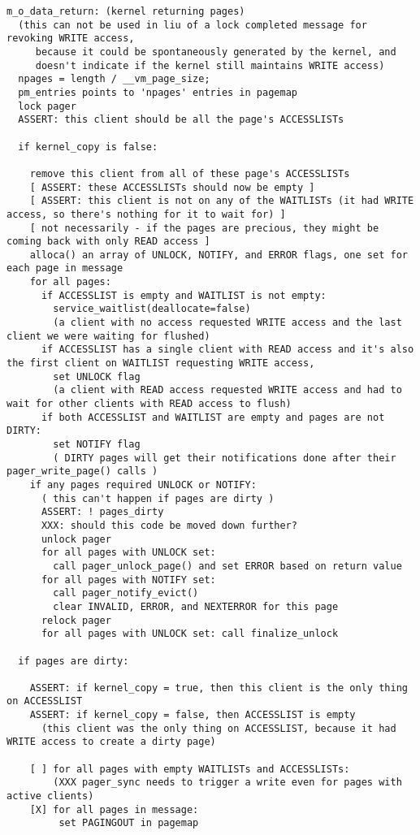 \documentclass{article}
\begin{document}
\begin{verbatim}
m_o_data_return: (kernel returning pages)
  (this can not be used in liu of a lock completed message for revoking WRITE access,
     because it could be spontaneously generated by the kernel, and
     doesn't indicate if the kernel still maintains WRITE access)
  npages = length / __vm_page_size;
  pm_entries points to 'npages' entries in pagemap
  lock pager
  ASSERT: this client should be all the page's ACCESSLISTs

  if kernel_copy is false:

    remove this client from all of these page's ACCESSLISTs
    [ ASSERT: these ACCESSLISTs should now be empty ]
    [ ASSERT: this client is not on any of the WAITLISTs (it had WRITE access, so there's nothing for it to wait for) ]
    [ not necessarily - if the pages are precious, they might be coming back with only READ access ]
    alloca() an array of UNLOCK, NOTIFY, and ERROR flags, one set for each page in message
    for all pages:
      if ACCESSLIST is empty and WAITLIST is not empty:
        service_waitlist(deallocate=false)
        (a client with no access requested WRITE access and the last client we were waiting for flushed)
      if ACCESSLIST has a single client with READ access and it's also the first client on WAITLIST requesting WRITE access,
        set UNLOCK flag
        (a client with READ access requested WRITE access and had to wait for other clients with READ access to flush)
      if both ACCESSLIST and WAITLIST are empty and pages are not DIRTY:
        set NOTIFY flag
        ( DIRTY pages will get their notifications done after their pager_write_page() calls )
    if any pages required UNLOCK or NOTIFY:
      ( this can't happen if pages are dirty )
      ASSERT: ! pages_dirty
      XXX: should this code be moved down further?
      unlock pager
      for all pages with UNLOCK set:
        call pager_unlock_page() and set ERROR based on return value
      for all pages with NOTIFY set:
        call pager_notify_evict()
        clear INVALID, ERROR, and NEXTERROR for this page
      relock pager
      for all pages with UNLOCK set: call finalize_unlock

  if pages are dirty:

    ASSERT: if kernel_copy = true, then this client is the only thing on ACCESSLIST
    ASSERT: if kernel_copy = false, then ACCESSLIST is empty
      (this client was the only thing on ACCESSLIST, because it had WRITE access to create a dirty page)

    [ ] for all pages with empty WAITLISTs and ACCESSLISTs:
        (XXX pager_sync needs to trigger a write even for pages with active clients)
    [X] for all pages in message:
         set PAGINGOUT in pagemap


\end{verbatim}
\end{document}
